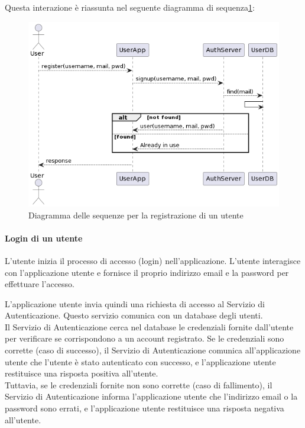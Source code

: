 Questa interazione è riassunta nel seguente diagramma di sequenza\ref{fig:signup}:
\begin{figure}[htbp]
    \centering
    \includegraphics[width=\textwidth]{images/signup.png}
    \caption{Diagramma delle sequenze per la registrazione di un utente}
    \label{fig:signup}
\end{figure}

\paragraph{Login di un utente}
L'utente inizia il processo di accesso (login) nell'applicazione. L'utente interagisce
con l'applicazione utente e fornisce il proprio indirizzo email e la password per effettuare l'accesso.

L'applicazione utente invia quindi una richiesta di accesso al Servizio di Autenticazione.
Questo servizio comunica con un database degli utenti.\\

Il Servizio di Autenticazione cerca nel database le credenziali fornite dall'utente per
verificare se corrispondono a un account registrato. Se le credenziali sono corrette
(caso di successo), il Servizio di Autenticazione comunica all'applicazione utente che
l'utente è stato autenticato con successo, e l'applicazione utente restituisce una
risposta positiva all'utente.\\

Tuttavia, se le credenziali fornite non sono corrette (caso di fallimento), il Servizio di
Autenticazione informa l'applicazione utente che l'indirizzo email o la password sono errati, e
l'applicazione utente restituisce una risposta negativa all'utente.

